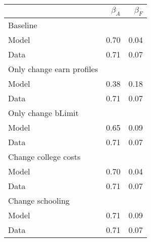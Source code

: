 \begin{tabular}{lrr}
\hline
  & $\beta_{A}$  & $\beta_{F}$  \\ 
\hline
Baseline &   &   \\ 
Model & 0.70  & 0.04  \\ 
Data & 0.71  & 0.07  \\ 
Only change earn profiles &   &   \\ 
Model & 0.38  & 0.18  \\ 
Data & 0.71  & 0.07  \\ 
Only change bLimit &   &   \\ 
Model & 0.65  & 0.09  \\ 
Data & 0.71  & 0.07  \\ 
Change college costs &   &   \\ 
Model & 0.70  & 0.04  \\ 
Data & 0.71  & 0.07  \\ 
Change schooling &   &   \\ 
Model & 0.71  & 0.09  \\ 
Data & 0.71  & 0.07  \\ 
\hline
\end{tabular}%
